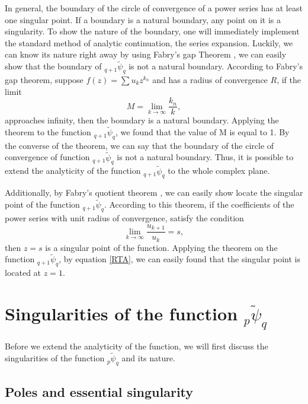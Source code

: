 In general, the boundary of the circle of convergence of a power series has at least one singular point. If a boundary is a natural boundary, any point on it is a singularity. To show the nature of the boundary, one will immediately implement the standard method of analytic continuation, the series expansion. Luckily, we can know its nature right away by using Fabry's gap Theorem \cite{2008189}, we can easily show that the boundary of $_{q+1}\tilde{\psi}_{q}$ is not a natural boundary. According to Fabry's gap theorem, suppose $f(z)=\sum u_k z^{k_n}$ and has a radius of convergence $R$, if the limit 
\begin{equation}
    M = \lim_{k \to \infty} \frac{k_n}{k},
\end{equation}
approaches infinity, then the boundary is a natural boundary. Applying the theorem to the function $_{q+1}\tilde{\psi}_{q}$, we found that the value of M is equal to 1. By the converse of the theorem, we can say that the boundary of the circle of convergence of function $_{q+1}\tilde{\psi}_{q}$ is not a natural boundary. Thus, it is possible to extend the analyticity of the function $_{q+1}\tilde{\psi}_{q}$ to the whole complex plane. 

Additionally, by Fabry's quotient theorem \cite{fabry1896points}, we can easily show locate the singular point of the function $_{q+1}\tilde{\psi}_{q}$. According to this theorem, if the coefficients of the power series with unit radius of convergence, satisfy the condition 
\begin{equation}
    \lim_{k \to \infty} \frac{u_{k+1}}{u_k}  = s,
\end{equation}
then $z=s$ is a singular point of the function. Applying the theorem on the function $_{q+1}\tilde{\psi}_{q}$, by equation \eqref{RTA}, we can easily found that the singular point is located at $z=1$.

\section{Singularities of the function ${}_{p}\tilde{\psi}_{q}$}

Before we extend the analyticity of the function, we will first discuss the singularities of the function ${}_{p}\tilde{\psi}_{q}$ and its nature.

\subsection{Poles and essential singularity}


